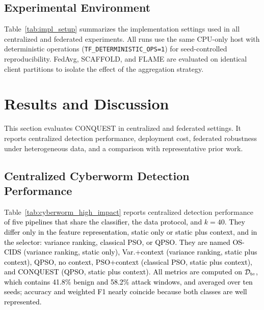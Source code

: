 \documentclass[conference]{IEEEtran}
\begin{document}
\subsection{Experimental Environment}
\label{subsec:impl_details}
Table~\ref{tab:impl_setup} summarizes the implementation settings
used in all centralized and federated experiments. All runs use the
same CPU-only host with deterministic operations
(\texttt{TF\_DETERMINISTIC\_OPS=1}) for seed-controlled
reproducibility. FedAvg, SCAFFOLD, and FLAME are evaluated on
identical client partitions to isolate the effect of the aggregation
strategy.



\section{\textbf{Results and Discussion}}
\label{sec:results_discussion}

This section evaluates CONQUEST in centralized and federated
settings. It reports centralized detection performance, deployment
cost, federated robustness under heterogeneous data, and a comparison
with representative prior work.

\subsection{Centralized Cyberworm Detection Performance}
\label{subsec:obj1_cyberworm_perf}

Table~\ref{tab:cyberworm_high_impact} reports centralized detection
performance \textcolor{black}{of five pipelines that share the
classifier, the data protocol, and $k=40$. They differ only in the
feature representation, static only or static plus context, and in
the selector: variance ranking, classical PSO, or QPSO. They are named
OS-CIDS (variance ranking, static only), Var.+context (variance
ranking, static plus context), QPSO, no context, PSO+context
(classical PSO, static plus context), and CONQUEST (QPSO, static plus
context). All metrics
are computed on $\mathcal{D}_{\rm te}$, which contains 41.8\% benign
and 58.2\% attack windows, and averaged over ten seeds; accuracy and
weighted F1 nearly coincide because both classes are well
represented.}
\end{document}

